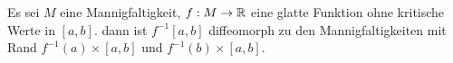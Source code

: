 \begin{corollary}
    Es sei $M$ eine Mannigfaltigkeit, $f: M \to { \mathbb R }$ eine glatte Funktion ohne
    kritische Werte in $[a, b]$. dann ist $f^{-1}[a, b]$ diffeomorph zu den
    Mannigfaltigkeiten mit Rand $f^{-1}(a) \times [a, b]$ und 
    $f^{-1}(b) \times [a, b]$.
\end{corollary}
